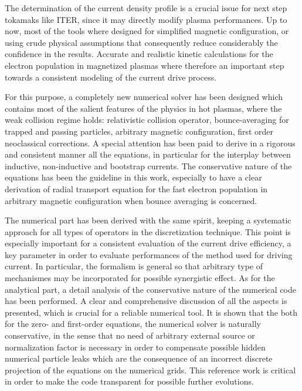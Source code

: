 

The determination of the current density profile is a crucial issue for next
step tokamaks like ITER, since it may directly modify plasma performances.
Up to now, most of the tools where designed for simplified magnetic
configuration, or using crude physical assumptions that consequently reduce
considerably the confidence in the results. Accurate and realistic kinetic
calculations for the electron population in magnetized plasmas where
therefore an important step towards a consistent modeling of the current
drive process.

For this purpose, a completely new numerical solver has been designed which
contains most of the salient features of the physics in hot plasmas, where
the weak collision regime holds: relativistic collision operator,
bounce-averaging for trapped and passing particles, arbitrary magnetic
configuration, first order neoclassical corrections. A special attention has
been paid to derive in a rigorous and consistent manner all the equations,
in particular for the interplay between inductive, non-inductive and
bootstrap currents. The conservative nature of the equations has been the
guideline in this work, especially to have a clear derivation of radial
transport equation for the fast electron population in arbitrary magnetic
configuration when bounce averaging is concerned.

The numerical part has been derived with the same spirit, keeping a
systematic approach for all types of operators in the discretization
technique. This point is especially important for a consistent evaluation of
the current drive efficiency, a key parameter in order to evaluate
performances of the method used for driving current. In particular, the
formalism is general so that arbitrary type of mechanismes may be
incorporated for possible synergistic effect. As for the analytical part, a
detail analysis of the conservative nature of the numerical code has been
performed. A clear and comprehensive discussion of all the aspects is
presented, which is crucial for a reliable numerical tool. It is shown that
the both for the zero- and first-order equations, the numerical solver is
naturally conservative, in the sense that no need of arbitrary external
source or normalization factor is necessary in order to compensate possible
hidden numerical particle leaks which are the consequence of an incorrect
discrete projection of the equations on the numerical grids. This reference
work is critical in order to make the code transparent for possible further
evolutions.


